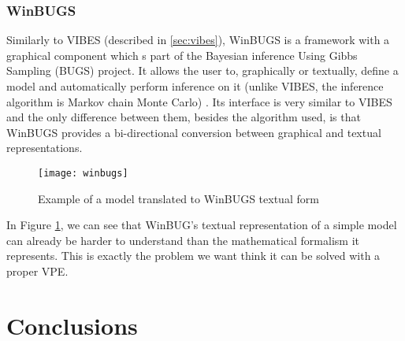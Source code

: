 \subsubsection{WinBUGS}
\label{sec:wbugs}

Similarly to VIBES (described in \ref{sec:vibes}), WinBUGS is a framework with a graphical
component which s part of the Bayesian inference Using Gibbs Sampling (BUGS) project.
It allows the user to, graphically or textually, define a model and automatically perform inference
on it (unlike VIBES, the inference algorithm is Markov chain Monte Carlo) \cite{Lunn2000}.
Its interface is very similar to VIBES and the only difference between them,
besides the algorithm used, is that WinBUGS provides a bi-directional conversion
between graphical and textual representations.

\begin{figure}[t]
  \begin{center}
    \leavevmode
    \texttt{[image: winbugs]}
    \caption{Example of a model translated to WinBUGS textual form \cite{winbugs}}
    \label{fig:winbugs}
  \end{center}
\end{figure}

In Figure \ref{fig:winbugs}, we can see that WinBUG's textual representation of
a simple model can already be harder to understand than the mathematical
formalism it represents. This is exactly the problem we want think it can be
solved with a proper VPE.

\section{Conclusions}
